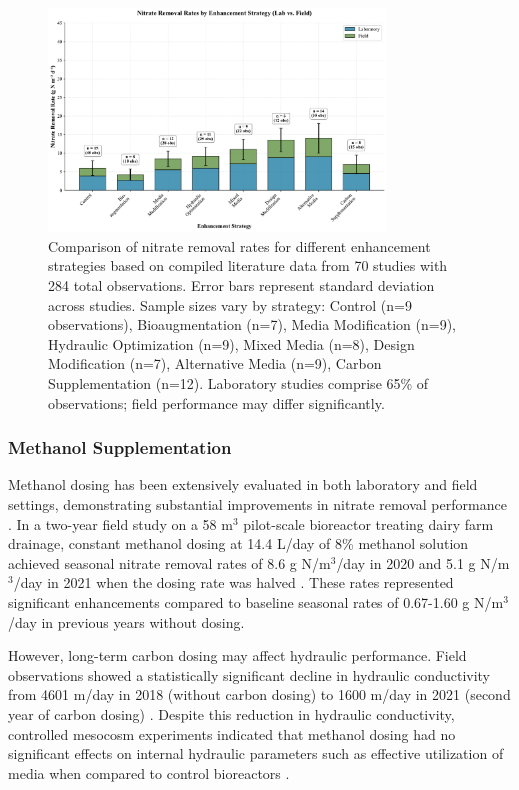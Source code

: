 \documentclass[12pt,a4paper]{article}
\begin{document}
\begin{figure}[ht]
\centering
\includegraphics[width=0.8\textwidth]{fig1_removal_rates_scientific}
\caption{Comparison of nitrate removal rates for different enhancement strategies based on compiled literature data from 70 studies with 284 total observations. Error bars represent standard deviation across studies. Sample sizes vary by strategy: Control (n=9 observations), Bioaugmentation (n=7), Media Modification (n=9), Hydraulic Optimization (n=9), Mixed Media (n=8), Design Modification (n=7), Alternative Media (n=9), Carbon Supplementation (n=12). Laboratory studies comprise 65\% of observations; field performance may differ significantly.}
\label{fig:removal_rates_by_strategy}
\end{figure}

\subsubsection{Methanol Supplementation}

Methanol dosing has been extensively evaluated in both laboratory and field settings, demonstrating substantial improvements in nitrate removal performance \citep{RN632}. In a two-year field study on a 58 m$^3$ pilot-scale bioreactor treating dairy farm drainage, constant methanol dosing at 14.4 L/day of 8\% methanol solution achieved seasonal nitrate removal rates of 8.6 g N/m$^3$/day in 2020 and 5.1 g N/m$^3$/day in 2021 when the dosing rate was halved \citep{RN632}. These rates represented significant enhancements compared to baseline seasonal rates of 0.67-1.60 g N/m$^3$/day in previous years without dosing.

However, long-term carbon dosing may affect hydraulic performance. Field observations showed a statistically significant decline in hydraulic conductivity from 4601 m/day in 2018 (without carbon dosing) to 1600 m/day in 2021 (second year of carbon dosing) \citep{RN632}. Despite this reduction in hydraulic conductivity, controlled mesocosm experiments indicated that methanol dosing had no significant effects on internal hydraulic parameters such as effective utilization of media when compared to control bioreactors \citep{RN632}.
\end{document}
